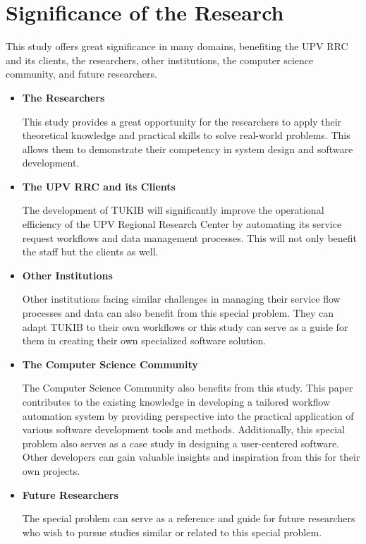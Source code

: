 \section{Significance of the Research}
\label{sec:significance}

This study offers great significance in many domains, benefiting the UPV RRC and its clients, the researchers, other institutions, the computer science community, and future researchers.

\begin{itemize}
	
	\item \textbf{The Researchers}
	
	This study provides a great opportunity for the researchers to apply their theoretical knowledge and practical skills to solve real-world problems. This allows them to demonstrate their competency in system design and software development. \newline
	
	\item \textbf{The UPV RRC and its Clients}
	
	The development of TUKIB will significantly improve the operational efficiency of the UPV Regional Research Center by automating its service request workflows and data management processes. This will not only benefit the staff but the clients as well.\newline
	
	\item \textbf{Other Institutions}
	
	Other institutions facing similar challenges in managing their service flow processes and data can also benefit from this special problem. They can adapt TUKIB to their own workflows or this study can serve as a guide for them in creating their own specialized software solution. \newline
	
	\item \textbf{The Computer Science Community}
	
	The Computer Science Community also benefits from this study. This paper contributes to the existing knowledge in developing a tailored workflow automation system by providing perspective into the practical application of various software development tools and  methods. Additionally, this special problem also serves as a case study in designing a user-centered software. Other developers can gain valuable insights and inspiration from this for their own projects.\newline
	
	\item \textbf{Future Researchers}
	
	The special problem can serve as a reference and guide for future
	researchers who wish to pursue studies similar or related to this special problem.\newline
	
\end {itemize}
